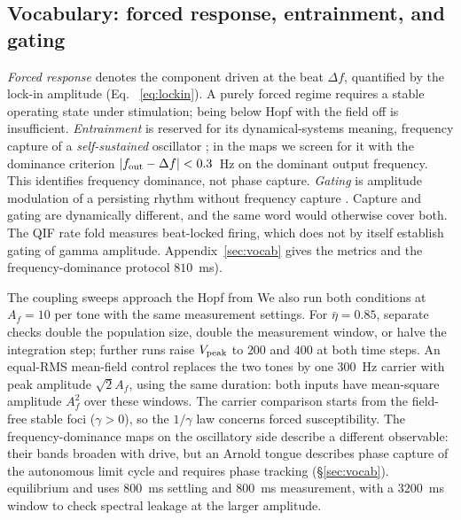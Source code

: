 \documentclass[11pt,a4paper]{article}
\providecommand{\DIFaddtex}[1]{{\protect\color{blue} \sf #1}} %
\providecommand{\DIFdeltex}[1]{{\protect\color{red} \scriptsize #1}} %
\providecommand{\DIFaddbegin}{} %
\providecommand{\DIFaddend}{} %
\providecommand{\DIFdelbegin}{} %
\providecommand{\DIFdelend}{} %
\providecommand{\DIFadd}[1]{\texorpdfstring{\DIFaddtex{#1}}{#1}} %
\providecommand{\DIFdel}[1]{\texorpdfstring{\DIFdeltex{#1}}{}} %
\begin{document}
\subsection{\DIFdel{Vocabulary: forced response, entrainment, and gating}}%
\addtocounter{subsection}{-1}%
\DIFdel{\emph{Forced response} denotes the component driven at the beat $\Delta f$,
quantified by the lock-in amplitude (Eq.
~\eqref{eq:lockin}). A purely forced regime
requires a stable operating state under stimulation; being below Hopf with the field
off is insufficient. \emph{Entrainment} is reserved for its
dynamical-systems meaning, frequency capture of a \emph{self-sustained} oscillator
\cite{pikovsky2001}; in the maps we screen for it with the
dominance criterion
$|f_{\rm out}-\Delta f|<0.3$~Hz on the dominant output frequency. This identifies
frequency dominance, not phase capture. \emph{Gating} is amplitude modulation of a persisting rhythm without frequency capture \cite{canolty2010,tort2010}. Capture and gating are dynamically different, and the same word would otherwise cover
both. The QIF rate fold measures beat-locked firing, which does not by itself
establish gating of gamma amplitude. Appendix~\ref{sec:vocab} gives the
metrics
and the frequency-dominance protocol}\DIFdelend \DIFaddbegin \DIFadd{$810$~ms)}\DIFaddend .

\DIFdelbegin \DIFdel{The coupling sweeps approach the Hopf from }\DIFdelend \DIFaddbegin \DIFadd{We also run both conditions at $A_f=10$ per tone with the same measurement
settings. For $\bar\eta=0.85$, separate checks double the population size,
double the measurement window, or halve the integration step; further runs raise
$V_{\rm peak}$ to $200$ and $400$ at both time steps. An equal-RMS
mean-field control replaces the two tones by one $300$~Hz carrier with peak
amplitude $\sqrt{2}A_f$, using the same duration: both inputs have mean-square
amplitude $A_f^2$ over these windows. The carrier comparison starts from the
}\DIFaddend field-free \DIFdelbegin \DIFdel{stable foci ($\gamma>0$), so the
$1/\gamma$ law concerns forced susceptibility. The frequency-dominance maps on
the oscillatory side describe a different observable: their bands broaden with
drive, but an Arnold tongue describes phase capture of the autonomous limit
cycle and
requires phase tracking (\S\ref{sec:vocab}).
}\DIFdelend \DIFaddbegin \DIFadd{equilibrium and uses $800$~ms settling and $800$~ms measurement,
with a $3200$~ms window to check spectral leakage at the larger amplitude.
}\DIFaddend
\end{document}
